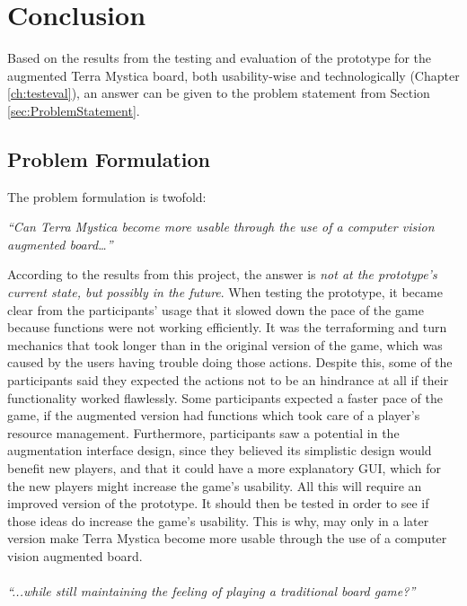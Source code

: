 \chapter{Conclusion}\label{ch:conclusion}
Based on the results from the testing and evaluation of the prototype for the augmented Terra Mystica board, both usability-wise and technologically (Chapter \ref{ch:testeval}), an answer can be given to the problem statement from Section \ref{sec:ProblemStatement}.

\section{Problem Formulation}
The problem formulation is twofold:

\textit{“Can Terra Mystica become more usable through the use of a computer vision augmented board…”}

According to the results from this project, the answer is \textit{not at the prototype’s current state, but possibly in the future}. When testing the prototype, it became clear from the participants' usage that it slowed down the pace of the game because functions were not working efficiently. It was the terraforming and turn mechanics that took longer than in the original version of the game, which was caused by the users having trouble doing those actions. Despite this, some of the participants said they expected the actions not to be an hindrance at all if their functionality worked flawlessly. Some participants expected a faster pace of the game, if the augmented version had functions which took care of a player’s resource management. Furthermore, participants saw a potential in the augmentation interface design, since they believed its simplistic design would benefit new players, and that it could have a more explanatory GUI, which for the new players might increase the game’s usability. All this will require an improved version of the prototype. It should then be tested in order to see if those ideas do increase the game’s usability. This is why, may only in a later version make Terra Mystica become more usable through the use of a computer vision augmented board.\\
\\

\textit{“...while still maintaining the feeling of playing a traditional board game?”}


